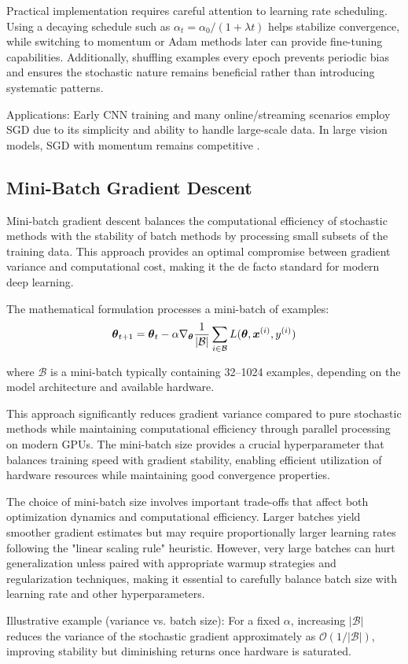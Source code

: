 Practical implementation requires careful attention to learning rate scheduling. Using a decaying schedule such as \(\alpha_t = \alpha_0/(1+\lambda t)\) helps stabilize convergence, while switching to momentum or Adam methods later can provide fine-tuning capabilities. Additionally, shuffling examples every epoch prevents periodic bias and ensures the stochastic nature remains beneficial rather than introducing systematic patterns.\cite{RobbinsMonro1951,WebOptimizationDLBook,D2LChapterOptimization}

Applications: Early CNN training and many online/streaming scenarios employ SGD due to its simplicity and ability to handle large-scale data. In large vision models, SGD with momentum remains competitive \cite{He2016}.

\subsection{Mini-Batch Gradient Descent}

Mini-batch gradient descent balances the computational efficiency of stochastic methods with the stability of batch methods by processing small subsets of the training data. This approach provides an optimal compromise between gradient variance and computational cost, making it the de facto standard for modern deep learning.

The mathematical formulation processes a mini-batch of examples:
\begin{equation}
\boldsymbol{\theta}_{t+1} = \boldsymbol{\theta}_t - \alpha \nabla_{\boldsymbol{\theta}} \frac{1}{|\mathcal{B}|} \sum_{i \in \mathcal{B}} L(\boldsymbol{\theta}, \boldsymbol{x}^{(i)}, y^{(i)})
\end{equation}

where $\mathcal{B}$ is a mini-batch typically containing 32–1024 examples, depending on the model architecture and available hardware.

This approach significantly reduces gradient variance compared to pure stochastic methods while maintaining computational efficiency through parallel processing on modern GPUs. The mini-batch size provides a crucial hyperparameter that balances training speed with gradient stability, enabling efficient utilization of hardware resources while maintaining good convergence properties.

The choice of mini-batch size involves important trade-offs that affect both optimization dynamics and computational efficiency. Larger batches yield smoother gradient estimates but may require proportionally larger learning rates following the "linear scaling rule" heuristic. However, very large batches can hurt generalization unless paired with appropriate warmup strategies and regularization techniques, making it essential to carefully balance batch size with learning rate and other hyperparameters.\cite{WebOptimizationDLBook,D2LChapterOptimization}

Illustrative example (variance vs. batch size): For a fixed \(\alpha\), increasing \(|\mathcal{B}|\) reduces the variance of the stochastic gradient approximately as \(\mathcal{O}(1/|\mathcal{B}|)\), improving stability but diminishing returns once hardware is saturated.

